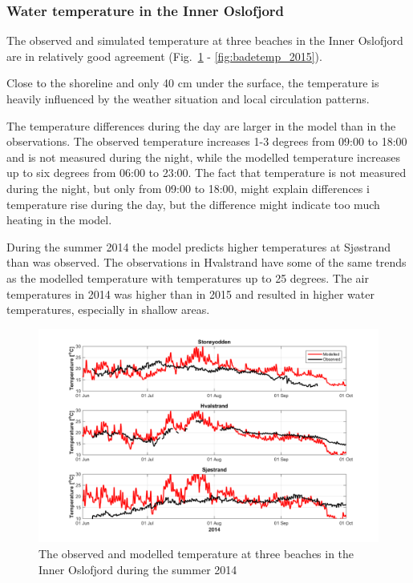 \clearpage

\subsubsection{Water temperature in the Inner Oslofjord}

The observed and simulated temperature at three beaches in the Inner Oslofjord are in relatively good agreement (Fig.~\ref{fig:badetemp_2014} - \ref{fig:badetemp_2015}). 

Close to the shoreline and only 40 cm under the surface, the temperature is heavily influenced by the weather situation and local circulation patterns. 

The temperature differences during the day are larger in the model than in the observations. The observed temperature increases 1-3 degrees from 09:00 to 18:00 and is not measured during the night, while the modelled temperature increases up to six degrees from 06:00 to 23:00. The fact that temperature is not measured during the night, but only from 09:00 to 18:00, might explain differences i temperature rise during the day, but the difference might indicate too much heating in the model.


During the summer 2014 the model predicts higher temperatures at Sj\o strand than was observed. The observations in Hvalstrand have some of the same trends as the modelled temperature with temperatures up to 25 degrees. The air temperatures in 2014 was higher than in 2015 and resulted in higher water temperatures, especially in shallow areas. 

\begin{figure}[ht]
\centerline{
\includegraphics*[trim=0 0 0 0,clip=true,width=\textwidth]{Figurer/badetemp_2014}
}
\caption{\small
The observed and modelled temperature at three beaches in the Inner Oslofjord during the summer 2014}
\label{fig:badetemp_2014}
\end{figure}

